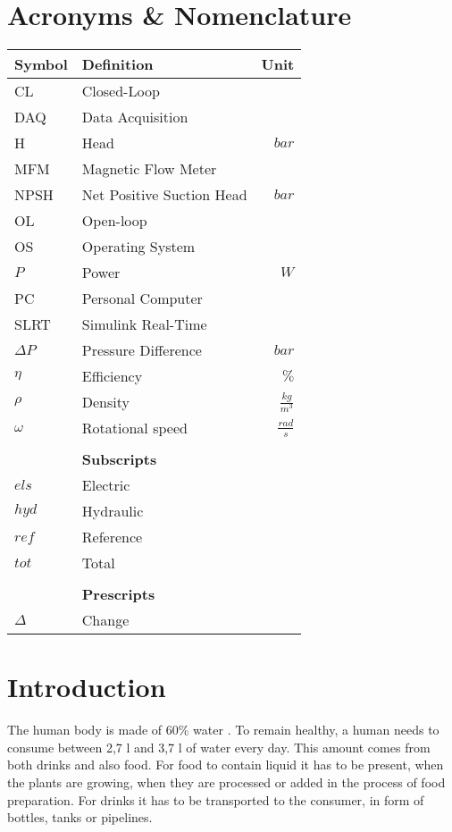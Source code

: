 \chapter*{Acronyms \& Nomenclature}
\begin{tabular*}{\textwidth}{@{\extracolsep{\fill}} l l r}
	\textbf{Symbol}	& \textbf{Definition}			& \textbf{Unit}\\
	\hline
	CL			& Closed-Loop						& \\
	DAQ 		& Data Acquisition		 			& \\
	H			& Head								& $bar$\\
	MFM 		& Magnetic Flow Meter 				& \\
	NPSH		& Net Positive Suction Head 		& $bar$\\
	OL			& Open-loop							& \\
	OS			& Operating System					& \\
	$P$			& Power								& $W$\\
	PC			& Personal Computer					& 	\\
	SLRT		& Simulink\textsuperscript{\textregistered{}} Real-Time\texttrademark{}& \\

	$\Delta P$	& Pressure Difference				& $bar$\\
	$\eta$		& Efficiency						& $\%$\\
	$\rho$		& Density							& $\frac{kg}{m^3}$\\
	$\omega$	& Rotational speed					& $\frac{rad}{s}$\\
	\hline \hline
				& 									&	\\
				& \textbf{Subscripts}				&	\\
	\hline
	$els$		& Electric							&	\\
	$hyd$		& Hydraulic							&	\\
	$ref$		& Reference							&	\\
	$tot$		& Total								&	\\
	\hline \hline
				& 									&	\\
				& \textbf{Prescripts}				&	\\
	\hline
	$\Delta$	& Change							&	\\
	\hline \hline
\end{tabular*}


\chapter{Introduction}\label{ch:introduction}
The human body is made of 60\% water \cite{HumanWater}.
To remain healthy,
a human needs to consume between 2,7 l and 3,7 l of water every day. \cite{DailyWater}
This amount comes from both drinks and also food.
For food to contain liquid it has to be present,
when the plants are growing,
when they are processed or added in the process of food preparation.
For drinks it has to be transported to the consumer,
in form of bottles, tanks or pipelines.

